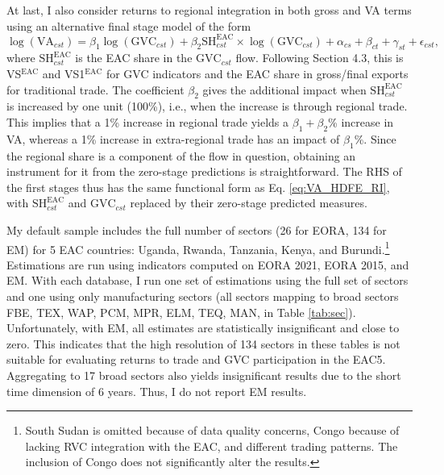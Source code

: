 \documentclass[a4paper]{article}
\begin{document}
At last, I also consider returns to regional integration in both gross and VA terms using an alternative final stage model of the form
%
\begin{equation} \label{eq:VA_HDFE_RI}
\log(\text{VA}_{cst}) = \beta_1 \log(\text{GVC}_{cst}) + \beta_2 \text{SH}_{cst}^\text{EAC} \times \log(\text{GVC}_{cst}) + \alpha_{cs} + \beta_{ct} +\gamma_{st} + \epsilon_{cst},
\end{equation}
%
where $\text{SH}_{cst}^\text{EAC}$ is the EAC share in the $\text{GVC}_{cst}$ flow. Following Section 4.3, this is VS$^\text{EAC}$ and VS1$^\text{EAC}$ for GVC indicators and the EAC share in gross/final exports for traditional trade. The coefficient $\beta_2$ gives the additional impact when $\text{SH}_{cst}^\text{EAC}$ is increased by one unit (100\%), i.e., when the increase is through regional trade. This implies that a 1\% increase in regional trade yields a $\beta_1+\beta_2$\% increase in VA, whereas a 1\% increase in extra-regional trade has an impact of $\beta_1$\%. Since the regional share is a component of the flow in question, obtaining an instrument for it from the zero-stage predictions is straightforward. The RHS of the first stages thus has the same functional form as Eq. \ref{eq:VA_HDFE_RI}, with $\text{SH}_{cst}^\text{EAC}$ and $\text{GVC}_{cst}$ replaced by their zero-stage predicted measures. \newline

My default sample includes the full number of sectors (26 for EORA, 134 for EM) for 5 EAC countries: Uganda, Rwanda, Tanzania, Kenya, and Burundi.\footnote{South Sudan is omitted because of data quality concerns, Congo because of lacking RVC integration with the EAC, and different trading patterns. The inclusion of Congo does not significantly alter the results. \vspace{-5mm}} Estimations are run using indicators computed on EORA 2021, EORA 2015, and EM. With each database, I run one set of estimations using the full set of sectors and one using only manufacturing sectors (all sectors mapping to broad sectors FBE, TEX, WAP, PCM, MPR, ELM, TEQ, MAN, in Table \ref{tab:sec}). Unfortunately, with EM, all estimates are statistically insignificant and close to zero. This indicates that the high resolution of 134 sectors in these tables is not suitable for evaluating returns to trade and GVC participation in the EAC5. Aggregating to 17 broad sectors also yields insignificant results due to the short time dimension of 6 years. Thus, I do not report EM results. 
\end{document}
